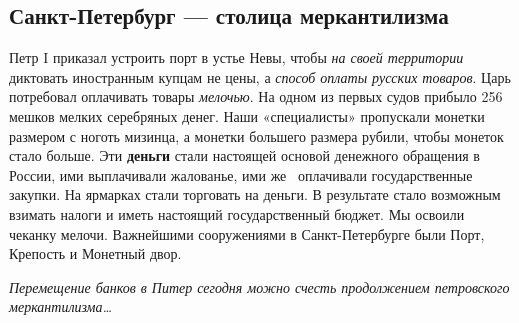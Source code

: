 \subsection[Санкт{}-Петербург — столица меркантилизма]{Санкт-Петербург — столица меркантилизма}
Петр \foreignlanguage{english}{I} приказал устроить порт в устье Невы, чтобы \textit{на своей территории} диктовать
иностранным купцам не цены, а \textit{способ оплаты русских товаров}. Царь потребовал оплачивать товары
\textit{мелочью}. На одном из первых судов прибыло 256 мешков мелких серебряных денег. Наши «специалисты» пропускали
монетки размером с ноготь мизинца, а монетки большего размера рубили, чтобы монеток стало больше. Эти \textbf{деньги}
стали настоящей основой денежного обращения в России, ими выплачивали жалованье, ими же \ оплачивали государственные
закупки. На ярмарках стали торговать на деньги. В результате стало возможным взимать налоги и иметь настоящий
государственный бюджет. Мы освоили чеканку мелочи. Важнейшими сооружениями в Санкт-Петербурге были Порт, Крепость и
Монетный двор.

\textit{Перемещение банков в Питер сегодня можно счесть продолжением петровского меркантилизма…}
%
